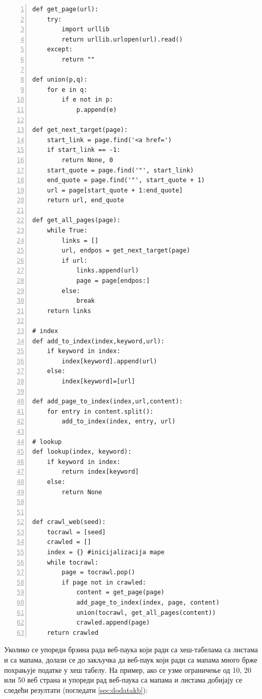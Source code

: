 \begin{lstlisting}[caption=Мапа уместо листе, label={lst:dictionary}, numbers=left]
def get_page(url):
    try:
        import urllib
        return urllib.urlopen(url).read()
    except:
        return ""

def union(p,q):
    for e in q:
        if e not in p:
            p.append(e)

def get_next_target(page):
    start_link = page.find('<a href=')
    if start_link == -1:
        return None, 0
    start_quote = page.find('"', start_link)
    end_quote = page.find('"', start_quote + 1)
    url = page[start_quote + 1:end_quote]
    return url, end_quote

def get_all_pages(page):
    while True:
        links = []
        url, endpos = get_next_target(page)
        if url:
            links.append(url)
            page = page[endpos:]
        else:
            break
    return links

# index
def add_to_index(index,keyword,url):
    if keyword in index:
        index[keyword].append(url)
    else:
        index[keyword]=[url]

def add_page_to_index(index,url,content):
    for entry in content.split():
        add_to_index(index, entry, url)

# lookup
def lookup(index, keyword):
    if keyword in index:
        return index[keyword]
    else:
        return None


def crawl_web(seed):
    tocrawl = [seed]
    crawled = []
    index = {} #inicijalizacija mape
    while tocrawl:
        page = tocrawl.pop()
        if page not in crawled:
            content = get_page(page)
            add_page_to_index(index, page, content)
            union(tocrawl, get_all_pages(content))
            crawled.append(page)
    return crawled
\end{lstlisting}

Уколико се упореди брзина рада веб-паука који ради са хеш-табелама са листама и са мапама, долази се до закључка да веб-паук који ради са мапама много брже похрањује податке у хеш табелу. На пример, ако се узме ограничење од 10, 20 или 50 веб страна и упореди рад веб-паука са мапама и листама добијају се  следећи резултати (погледати \ref{sec:dodatakb}):


